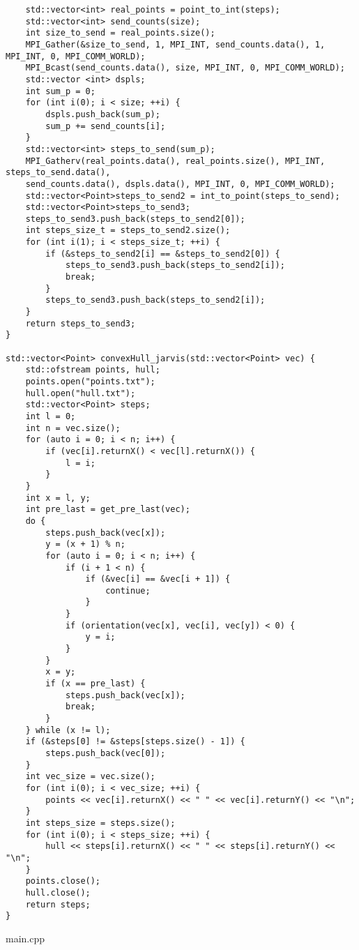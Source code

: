 \documentclass{report}
\begin{document}
\begin{lstlisting}
    std::vector<int> real_points = point_to_int(steps);
    std::vector<int> send_counts(size);
    int size_to_send = real_points.size();
    MPI_Gather(&size_to_send, 1, MPI_INT, send_counts.data(), 1, MPI_INT, 0, MPI_COMM_WORLD);
    MPI_Bcast(send_counts.data(), size, MPI_INT, 0, MPI_COMM_WORLD);
    std::vector <int> dspls;
    int sum_p = 0;
    for (int i(0); i < size; ++i) {
        dspls.push_back(sum_p);
        sum_p += send_counts[i];
    }
    std::vector<int> steps_to_send(sum_p);
    MPI_Gatherv(real_points.data(), real_points.size(), MPI_INT, steps_to_send.data(),
    send_counts.data(), dspls.data(), MPI_INT, 0, MPI_COMM_WORLD);
    std::vector<Point>steps_to_send2 = int_to_point(steps_to_send);
    std::vector<Point>steps_to_send3;
    steps_to_send3.push_back(steps_to_send2[0]);
    int steps_size_t = steps_to_send2.size();
    for (int i(1); i < steps_size_t; ++i) {
        if (&steps_to_send2[i] == &steps_to_send2[0]) {
            steps_to_send3.push_back(steps_to_send2[i]);
            break;
        }
        steps_to_send3.push_back(steps_to_send2[i]);
    }
    return steps_to_send3;
}

std::vector<Point> convexHull_jarvis(std::vector<Point> vec) {
    std::ofstream points, hull;
    points.open("points.txt");
    hull.open("hull.txt");
    std::vector<Point> steps;
    int l = 0;
    int n = vec.size();
    for (auto i = 0; i < n; i++) {
        if (vec[i].returnX() < vec[l].returnX()) {
            l = i;
        }
    }
    int x = l, y;
    int pre_last = get_pre_last(vec);
    do {
        steps.push_back(vec[x]);
        y = (x + 1) % n;
        for (auto i = 0; i < n; i++) {
            if (i + 1 < n) {
                if (&vec[i] == &vec[i + 1]) {
                    continue;
                }
            }
            if (orientation(vec[x], vec[i], vec[y]) < 0) {
                y = i;
            }
        }
        x = y;
        if (x == pre_last) {
            steps.push_back(vec[x]);
            break;
        }
    } while (x != l);
    if (&steps[0] != &steps[steps.size() - 1]) {
        steps.push_back(vec[0]);
    }
    int vec_size = vec.size();
    for (int i(0); i < vec_size; ++i) {
        points << vec[i].returnX() << " " << vec[i].returnY() << "\n";
    }
    int steps_size = steps.size();
    for (int i(0); i < steps_size; ++i) {
        hull << steps[i].returnX() << " " << steps[i].returnY() << "\n";
    }
    points.close();
    hull.close();
    return steps;
}
\end{lstlisting}
main.cpp
\end{document}
